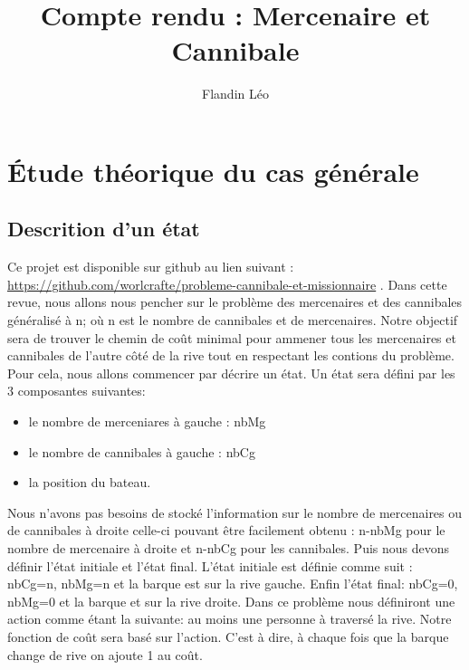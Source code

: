 \documentclass[a4paper, 12pt, french,oneside]{book}
\title{Compte rendu : Mercenaire et Cannibale}
\author{Flandin Léo}
\begin{document}
\maketitle
\tableofcontents

\mainmatter
\chapter{Étude théorique du cas générale}
\section{Descrition d'un état}
Ce projet est disponible sur github au lien suivant : \url{https://github.com/worlcrafte/probleme-cannibale-et-missionnaire} .
Dans cette revue, nous allons nous pencher sur le problème des mercenaires et des cannibales généralisé à n; où n est le nombre de cannibales et de mercenaires. Notre objectif sera de trouver le chemin de coût minimal pour ammener tous les mercenaires et cannibales de l'autre côté de la rive tout en respectant les contions du problème. Pour cela, nous allons commencer par décrire un état. Un état sera défini par les 3 composantes suivantes:
\begin{itemize}
    \item le nombre de merceniares à gauche : nbMg
    \item le nombre de cannibales à gauche : nbCg
    \item la position du bateau.
\end{itemize}
Nous n'avons pas besoins de stocké l'information sur le nombre de mercenaires ou de cannibales à droite celle-ci pouvant être facilement obtenu : n-nbMg pour le nombre de mercenaire à droite et n-nbCg pour les cannibales. Puis nous devons définir l'état initiale et l'état final. L'état initiale est définie comme suit : nbCg=n, nbMg=n et la barque est sur la rive gauche. Enfin l'état final: nbCg=0, nbMg=0 et la barque et sur la rive droite. Dans ce problème nous définiront une action comme étant la suivante: au moins une personne à traversé la rive. Notre fonction de coût sera basé sur l'action. C'est à dire, à chaque fois que la barque change de rive on ajoute 1 au coût.
\end{document}
